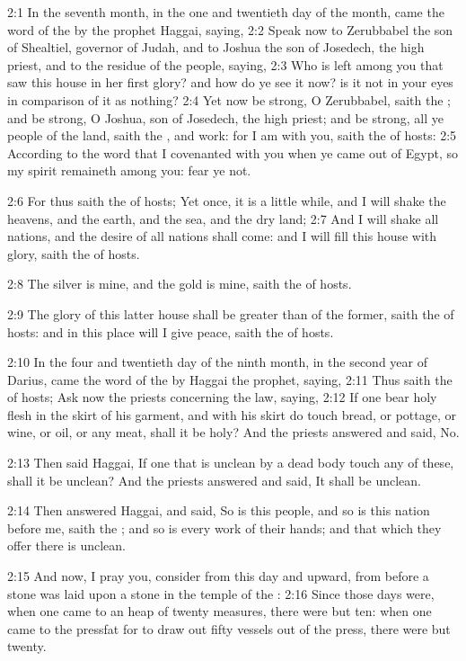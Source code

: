 2:1 In the seventh month, in the one and twentieth day of the month,
came the word of the \LORD by the prophet Haggai, saying, 2:2 Speak now
to Zerubbabel the son of Shealtiel, governor of Judah, and to Joshua
the son of Josedech, the high priest, and to the residue of the
people, saying, 2:3 Who is left among you that saw this house in her
first glory? and how do ye see it now? is it not in your eyes in
comparison of it as nothing?  2:4 Yet now be strong, O Zerubbabel,
saith the \LORD; and be strong, O Joshua, son of Josedech, the high
priest; and be strong, all ye people of the land, saith the \LORD, and
work: for I am with you, saith the \LORD of hosts: 2:5 According to the
word that I covenanted with you when ye came out of Egypt, so my
spirit remaineth among you: fear ye not.

2:6 For thus saith the \LORD of hosts; Yet once, it is a little while,
and I will shake the heavens, and the earth, and the sea, and the dry
land; 2:7 And I will shake all nations, and the desire of all nations
shall come: and I will fill this house with glory, saith the \LORD of
hosts.

2:8 The silver is mine, and the gold is mine, saith the \LORD of hosts.

2:9 The glory of this latter house shall be greater than of the
former, saith the \LORD of hosts: and in this place will I give peace,
saith the \LORD of hosts.

2:10 In the four and twentieth day of the ninth month, in the second
year of Darius, came the word of the \LORD by Haggai the prophet,
saying, 2:11 Thus saith the \LORD of hosts; Ask now the priests
concerning the law, saying, 2:12 If one bear holy flesh in the skirt
of his garment, and with his skirt do touch bread, or pottage, or
wine, or oil, or any meat, shall it be holy? And the priests answered
and said, No.

2:13 Then said Haggai, If one that is unclean by a dead body touch any
of these, shall it be unclean? And the priests answered and said, It
shall be unclean.

2:14 Then answered Haggai, and said, So is this people, and so is this
nation before me, saith the \LORD; and so is every work of their hands;
and that which they offer there is unclean.

2:15 And now, I pray you, consider from this day and upward, from
before a stone was laid upon a stone in the temple of the \LORD: 2:16
Since those days were, when one came to an heap of twenty measures,
there were but ten: when one came to the pressfat for to draw out
fifty vessels out of the press, there were but twenty.

